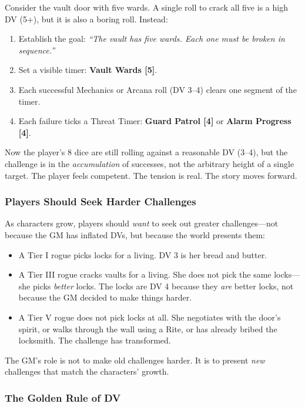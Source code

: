 Consider the vault door with five wards. A single roll to crack all five is a high DV (5+), but it is also a boring roll. Instead:

\begin{enumerate}
  \item Establish the goal: \textit{``The vault has five wards. Each one must be broken in sequence.''}
  \item Set a visible timer: \textbf{Vault Wards [5]}.
  \item Each successful Mechanics or Arcana roll (DV 3--4) clears one segment of the timer.
  \item Each failure ticks a Threat Timer: \textbf{Guard Patrol [4]} or \textbf{Alarm Progress [4]}.
\end{enumerate}

Now the player's 8 dice are still rolling against a reasonable DV (3--4), but the challenge is in the \textit{accumulation} of successes, not the arbitrary height of a single target. The player feels competent. The tension is real. The story moves forward.

\subsubsection{Players Should Seek Harder Challenges}

As characters grow, players should \textit{want} to seek out greater challenges---not because the GM has inflated DVs, but because the world presents them:

\begin{itemize}
  \item A Tier I rogue picks locks for a living. DV 3 is her bread and butter.
  \item A Tier III rogue cracks vaults for a living. She does not pick the same locks---she picks \textit{better} locks. The locks are DV 4 because they \textit{are} better locks, not because the GM decided to make things harder.
  \item A Tier V rogue does not pick locks at all. She negotiates with the door's spirit, or walks through the wall using a Rite, or has already bribed the locksmith. The challenge has transformed.
\end{itemize}

The GM's role is not to make old challenges harder. It is to present \textit{new} challenges that match the characters' growth.

\subsubsection{The Golden Rule of DV}

